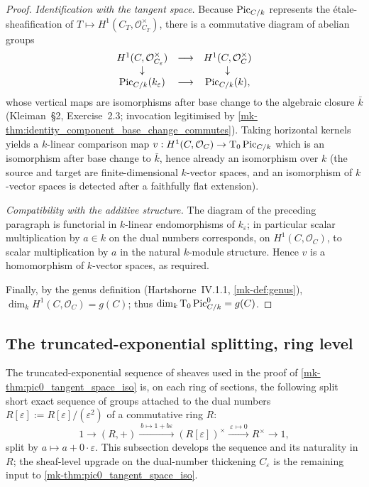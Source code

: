 \begin{proof}
  \emph{Identification with the tangent space.} Because \(\operatorname{Pic}_{C/k}\)
  represents the étale-sheafification of
  \(T \mapsto H^1(C_T, \mathcal{O}_{C_T}^{\times})\), there is a
  commutative diagram of abelian groups
  \[
    \begin{array}{ccc}
      H^1(C, \mathcal{O}_{C_\varepsilon}^{\times}) &
        \longrightarrow & H^1(C, \mathcal{O}_C^{\times}) \\
      \downarrow & & \downarrow \\
      \operatorname{Pic}_{C/k}(k_\varepsilon) & \longrightarrow &
        \operatorname{Pic}_{C/k}(k),
    \end{array}
  \]
  whose vertical maps are isomorphisms after base change to the
  algebraic closure \(\bar k\) (Kleiman~\S 2, Exercise~2.3;
  invocation legitimised by
  \ref{mk-thm:identity_component_base_change_commutes}). Taking horizontal
  kernels yields a \(k\)-linear comparison map
  \(v : H^1(C, \mathcal{O}_C) \to \textup T_0 \operatorname{Pic}_{C/k}\) which is an
  isomorphism after base change to \(\bar k\), hence already an
  isomorphism over \(k\) (the source and target are finite-dimensional
  \(k\)-vector spaces, and an isomorphism of \(k\)-vector spaces is
  detected after a faithfully flat extension).

  \emph{Compatibility with the additive structure.} The diagram of the
  preceding paragraph is functorial in \(k\)-linear endomorphisms of
  \(k_\varepsilon\); in particular scalar multiplication by \(a \in
  k\) on the dual numbers corresponds, on
  \(H^1(C, \mathcal{O}_C)\), to scalar multiplication by \(a\) in the
  natural \(k\)-module structure. Hence \(v\) is a homomorphism of
  \(k\)-vector spaces, as required.

  Finally, by the genus definition (Hartshorne~IV.1.1,
  \ref{mk-def:genus}), \(\dim_k H^1(C, \mathcal{O}_C) = g(C)\); thus
  \(\dim_k \textup T_0 \operatorname{Pic}^0_{C/k} = g(C)\).
\end{proof}

\subsection{The truncated-exponential splitting, ring level}
\label{mk-sec:pic0_trunc_exp}

The truncated-exponential sequence of sheaves used in the proof of
\ref{mk-thm:pic0_tangent_space_iso} is, on each ring of sections, the
following split short exact sequence of groups attached to the dual
numbers \(R[\varepsilon] := R[\varepsilon]/(\varepsilon^2)\) of a
commutative ring \(R\):
\[
  1 \longrightarrow (R, +)
    \xrightarrow{\ b \mapsto 1 + b\varepsilon\ }
    (R[\varepsilon])^{\times}
    \xrightarrow{\ \varepsilon \mapsto 0\ }
    R^{\times} \longrightarrow 1,
\]
split by \(a \mapsto a + 0\cdot\varepsilon\). This subsection develops
the sequence and its naturality in \(R\); the sheaf-level upgrade on the
dual-number thickening \(C_\varepsilon\) is the remaining input to
\ref{mk-thm:pic0_tangent_space_iso}.

